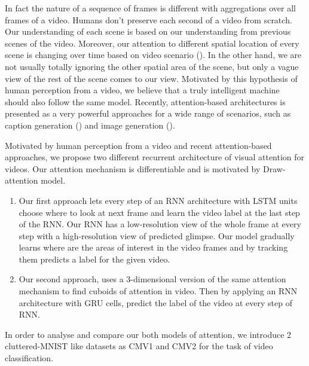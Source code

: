 \documentclass{article} %
\begin{document}
In fact the nature of a sequence of frames is different with aggregations over all frames of a video. Humans don't preserve each second of a video from scratch. Our understanding of each scene is based on our understanding from previous scenes of the video. Moreover, our attention to different spatial location of every scene is changing over time based on video scenario (\cite{rensink2000dynamic}). In the other hand, we are not usually totally ignoring the other spatial area of the scene, but only a vague view of the rest of the scene comes to our view. Motivated by this hypothesis of human perception from a video, we believe that a truly intelligent machine should also follow the same model.
Recently, attention-based architectures is presented as a very powerful approaches for a wide range of scenarios, such as caption generation (\cite{xu2015show}) and image generation (\cite{gregor2015draw}).

Motivated by human perception from a video and recent attention-based approaches, we propose two different recurrent architecture of visual attention for videos. Our attention mechanism is differentiable and is motivated by Draw-attention model.
\begin{enumerate} 
\item Our first approach lets every step of an RNN architecture with LSTM units choose where to look at next frame and learn the video label at the last step of the RNN. Our RNN has a low-resolution view of the whole frame at every step with a high-resolution view of predicted glimpse. Our model gradually learns where are the areas of interest in the video frames and by tracking them predicts a label for the given video.
\item Our second approach, uses a 3-dimensional version of the same attention mechanism to find cuboids of attention in video. Then by applying an RNN architecture with GRU cells, predict the label of the video at every step of RNN.   
\end{enumerate}

In order to analyse and compare our both models of attention, we introduce 2 cluttered-MNIST like datasets as CMV1 and CMV2 for the task of video classification.
\end{document}

